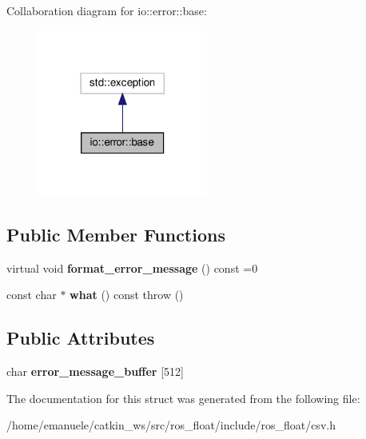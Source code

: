 Collaboration diagram for io\+:\+:error\+:\+:base\+:\nopagebreak
\begin{figure}[H]
\begin{center}
\leavevmode
\includegraphics[width=158pt]{structio_1_1error_1_1base__coll__graph}
\end{center}
\end{figure}
\subsection*{Public Member Functions}
\begin{DoxyCompactItemize}
\item 
\mbox{\label{structio_1_1error_1_1base_a7d9ff6a31b716a24f056cf8a3e15191d}} 
virtual void {\bfseries format\+\_\+error\+\_\+message} () const =0
\item 
\mbox{\label{structio_1_1error_1_1base_a35483dfbe91cea45cfa7c5613e83e5ef}} 
const char $\ast$ {\bfseries what} () const  throw ()
\end{DoxyCompactItemize}
\subsection*{Public Attributes}
\begin{DoxyCompactItemize}
\item 
\mbox{\label{structio_1_1error_1_1base_a3be516c4636b7b61133968cb8081c885}} 
char {\bfseries error\+\_\+message\+\_\+buffer} \mbox{[}512\mbox{]}
\end{DoxyCompactItemize}


The documentation for this struct was generated from the following file\+:\begin{DoxyCompactItemize}
\item 
/home/emanuele/catkin\+\_\+ws/src/ros\+\_\+float/include/ros\+\_\+float/csv.\+h\end{DoxyCompactItemize}
